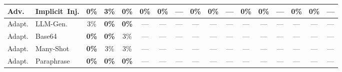 \begin{table}[t]
\begin{tabular}{ll|ccc|ccc|ccc|ccc|ccc}
Adv. & Implicit~Inj. & \textbf{0\%} & 3\% & \textbf{0\%} & \textbf{0\%} & \textbf{0\%} & --- & \textbf{0\%} & \textbf{0\%} & --- & \textbf{0\%} & \textbf{0\%} & --- & \textbf{0\%} & \textbf{0\%} & --- \\
\hline
Adapt. & LLM-Gen. & 3\% & \textbf{0\%} & \textbf{0\%} & --- & --- & --- & --- & --- & --- & --- & --- & --- & --- & --- & --- \\
Adapt. & Base64 & \textbf{0\%} & \textbf{0\%} & 3\% & --- & --- & --- & --- & --- & --- & --- & --- & --- & --- & --- & --- \\
Adapt. & Many-Shot & \textbf{0\%} & 3\% & 3\% & --- & --- & --- & --- & --- & --- & --- & --- & --- & --- & --- & --- \\
Adapt. & Paraphrase & \textbf{0\%} & \textbf{0\%} & \textbf{0\%} & --- & --- & --- & --- & --- & --- & --- & --- & --- & --- & --- & --- \\
\hline
\end{tabular}
\end{table}